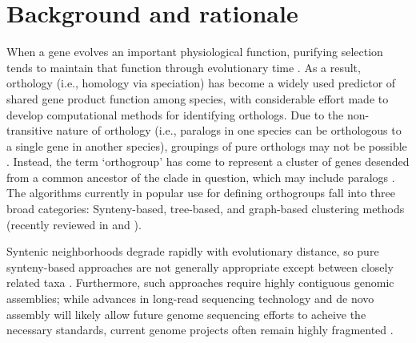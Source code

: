 \documentclass[twocolumn]{bmcart}%
\begin{document}


\section{Background and rationale}
When a gene evolves an important physiological function, purifying selection tends to maintain that function through evolutionary time \cite{Altenhoff:2012ea, Rogozin:2014fp, KryuchkovaMostacci:2016iw}.
As a result, orthology (i.e., homology via speciation) has become a widely used predictor of shared gene product function among species, with considerable effort made to develop computational methods for identifying orthologs.
Due to the non-transitive nature of orthology (i.e., paralogs in one species can be orthologous to a single gene in another species), groupings of pure orthologs may not be possible \cite{Fitch:2000tf}.
Instead, the term `orthogroup' has come to represent a cluster of genes desended from a common ancestor of the clade in question, which may include paralogs \cite{Wapinski:2007fa}.
The algorithms currently in popular use for defining orthogroups fall into three broad categories: Synteny-based, tree-based, and graph-based clustering methods (recently reviewed in \cite{Tekaia:2016ga} and \cite{Habermann2016}).

Syntenic neighborhoods degrade rapidly with evolutionary distance, so pure synteny-based approaches are not generally appropriate except between closely related taxa \cite{Kristensen:2011gw}.
Furthermore, such approaches require highly contiguous genomic assemblies; while advances in long-read sequencing technology and de novo assembly will likely allow future genome sequencing efforts to acheive the necessary standards, current genome projects often remain highly fragmented \cite{Koren:2015il}.
\end{document}
